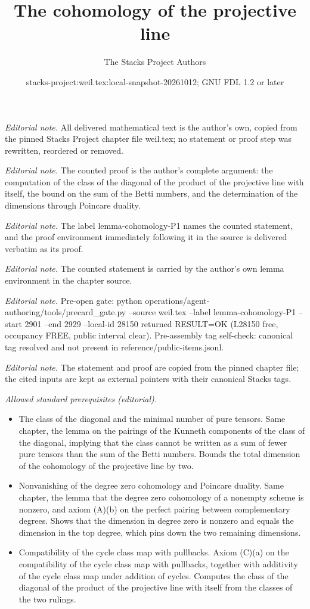 \documentclass[10pt,a4paper]{amsart}
\title{The cohomology of the projective line}
\author{The Stacks Project Authors}
\date{stacks-project:weil.tex:local-snapshot-20261012; GNU FDL 1.2 or later}
\theoremstyle{plain}
\theoremstyle{definition}
\theoremstyle{remark}
\numberwithin{equation}{subsection}
\begin{document}
\maketitle
\noindent\textit{Editorial note.} All delivered mathematical text is the author's own, copied from the pinned Stacks Project chapter file weil.tex; no statement or proof step was rewritten, reordered or removed.\par\medskip
\noindent\textit{Editorial note.} The counted proof is the author's complete argument: the computation of the class of the diagonal of the product of the projective line with itself, the bound on the sum of the Betti numbers, and the determination of the dimensions through Poincare duality.\par\medskip
\noindent\textit{Editorial note.} The label lemma-cohomology-P1 names the counted statement, and the proof environment immediately following it in the source is delivered verbatim as its proof.\par\medskip
\noindent\textit{Editorial note.} The counted statement is carried by the author's own lemma environment in the chapter source.\par\medskip
\noindent\textit{Editorial note.} Pre-open gate: python operations/agent-authoring/tools/precard\_gate.py --source weil.tex --label lemma-cohomology-P1 --start 2901 --end 2929 --local-id 28150 returned RESULT=OK (L28150 free, occupancy FREE, public interval clear). Pre-assembly tag self-check: canonical tag resolved and not present in reference/public-items.jsonl.\par\medskip
\noindent\textit{Editorial note.} The statement and proof are copied from the pinned chapter file; the cited inputs are kept as external pointers with their canonical Stacks tags.\par\medskip
\noindent\textit{Allowed standard prerequisites (editorial).}\begin{itemize}
\item The class of the diagonal and the minimal number of pure tensors. Same chapter, the lemma on the pairings of the Kunneth components of the class of the diagonal, implying that the class cannot be written as a sum of fewer pure tensors than the sum of the Betti numbers. Bounds the total dimension of the cohomology of the projective line by two.
\item Nonvanishing of the degree zero cohomology and Poincare duality. Same chapter, the lemma that the degree zero cohomology of a nonempty scheme is nonzero, and axiom (A)(b) on the perfect pairing between complementary degrees. Shows that the dimension in degree zero is nonzero and equals the dimension in the top degree, which pins down the two remaining dimensions.
\item Compatibility of the cycle class map with pullbacks. Axiom (C)(a) on the compatibility of the cycle class map with pullbacks, together with additivity of the cycle class map under addition of cycles. Computes the class of the diagonal of the product of the projective line with itself from the classes of the two rulings.
\end{itemize}\medskip
\end{document}
